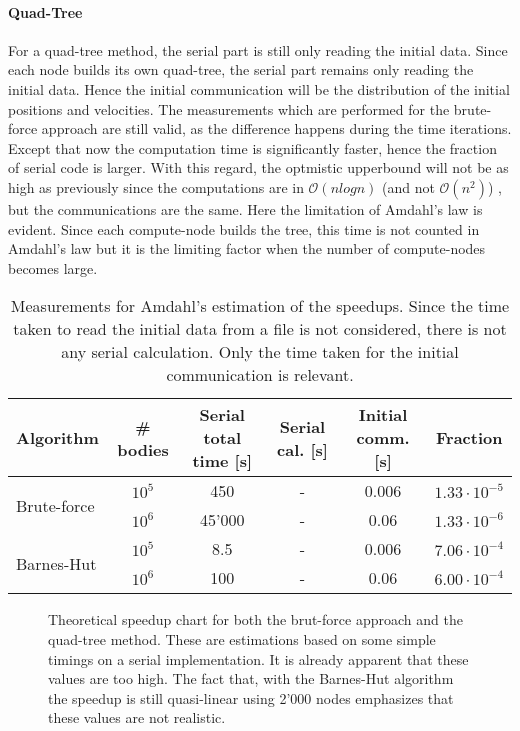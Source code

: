 \paragraph{Quad-Tree}
For a quad-tree method, the serial part is still only reading the initial data. Since each node builds its own quad-tree, the serial part remains only reading the initial data. Hence the initial communication will be the distribution of the initial positions and velocities. The measurements which are performed for the brute-force approach are still valid, as the difference happens during the time iterations. Except that now the computation time is significantly faster, hence the fraction of serial code is larger.  With this regard, the optmistic upperbound will not be as high as previously since the computations are in $\mathcal{O}(nlogn)$ (and not $\mathcal{O}(n^2)$) , but the communications are the same. Here the limitation of Amdahl's law is evident. Since each compute-node builds the tree, this time is not counted in Amdahl's law but it is the limiting factor when the number of compute-nodes becomes large.

\begin{table}[H]
\centering
\begin{tabular}{l|ccccc}
Algorithm                    & \# bodies & Serial total time [s] & Serial cal. [s] & Initial comm. [s] & Fraction \\
\hline\multirow{2}{*}{Brute-force} & $10^5$    & 450  & - & 0.006 &$1.33\cdot 10^{-5}$\\
                             & $10^6$    & 45'000& - & 0.06  &$1.33\cdot 10^{-6}$\\     
\multirow{2}{*}{Barnes-Hut}  & $10^5$    & 8.5  & - & 0.006 &$7.06\cdot 10^{-4}$\\
                             & $10^6$    & 100  & - & 0.06  &$6.00\cdot 10^{-4}$\\
\end{tabular}
\caption{Measurements for Amdahl's estimation of the speedups. Since the time taken to read the initial data from a file is not considered, there is not any serial calculation. Only the time taken for the initial communication is relevant.}
\label{tab:amdahl}
\end{table}

\begin{figure}[H]

\caption{Theoretical speedup chart for both the brut-force approach and the quad-tree method. These are estimations based on some simple timings on a serial implementation. It is already apparent that these values are too high. The fact that, with the Barnes-Hut algorithm the speedup is still quasi-linear using 2'000 nodes emphasizes that these values are not realistic.}
\label{fig:amdahl}
\end{figure}

